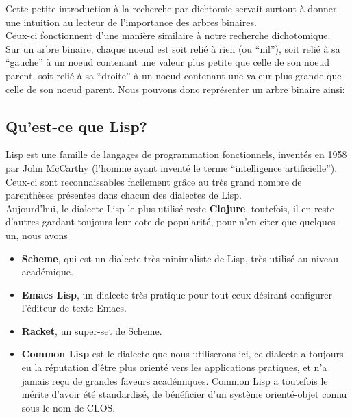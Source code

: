 \documentclass[a4paper, 12pt]{article}
\numberwithin{equation}{subsection}
\begin{document}
Cette petite introduction à la recherche par dichtomie servait surtout à donner une intuition au lecteur de l'importance des arbres binaires. \\
Ceux-ci fonctionnent d'une manière similaire à notre recherche dichotomique. \\
Sur un arbre binaire, chaque noeud est soit relié à rien (ou ``nil''), soit relié à sa ``gauche'' à un noeud contenant une valeur plus petite que celle de son noeud parent, soit relié à sa ``droite'' à un noeud contenant une valeur plus grande que celle de son noeud parent. Nous pouvons donc représenter un arbre binaire ainsi: \\[0.2cm]

\subsection{Qu'est-ce que Lisp?}
Lisp est une famille de langages de programmation fonctionnels, inventés en 1958 par John McCarthy (l'homme ayant inventé le terme ``intelligence artificielle''). \\
Ceux-ci sont reconnaissables facilement grâce au très grand nombre de parenthèses présentes dans chacun des dialectes de Lisp. \\
Aujourd'hui, le dialecte Lisp le plus utilisé reste {\bf Clojure}, toutefois, il en reste d'autres gardant toujours leur cote de popularité, pour n'en citer que quelques-un, nous avons
\begin{itemize}
  \item {\bf Scheme}, qui est un dialecte très minimaliste de Lisp, très utilisé au niveau académique.
  \item {\bf Emacs Lisp}, un dialecte très pratique pour tout ceux désirant configurer l'éditeur de texte Emacs.
  \item {\bf Racket}, un super-set de Scheme.
  \item {\bf Common Lisp} est le dialecte que nous utiliserons ici, ce dialecte a toujours eu la réputation d'être plus orienté vers les applications pratiques, et n'a jamais reçu de grandes faveurs académiques. Common Lisp a toutefois le mérite d'avoir été standardisé, de bénéficier d'un système orienté-objet connu sous le nom de CLOS.
\end{itemize}
\end{document}
